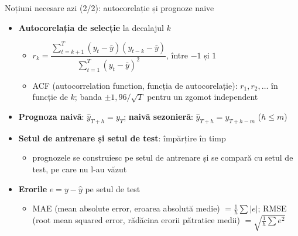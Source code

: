\begin{frame}{Noțiuni necesare azi (2/2): autocorelație și prognoze naive}
\itemsize{\footnotesize}
\begin{itemize}
    \item \textbf{Autocorelația de selecție} la decalajul $k$
    \begin{itemize}
        \item $r_k = \dfrac{\sum_{t=k+1}^{T} (y_t - \bar y)(y_{t-k} - \bar y)}{\sum_{t=1}^{T} (y_t - \bar y)^2}$, între $-1$ și $1$
        \item ACF (autocorrelation function, funcția de autocorelație): $r_1, r_2, \ldots$ în funcție de $k$; banda $\pm 1{,}96/\sqrt T$ pentru un zgomot independent
    \end{itemize}
    \item \textbf{Prognoza naivă}: $\hat y_{T+h} = y_T$; \textbf{naivă sezonieră}: $\hat y_{T+h} = y_{T+h-m}$ ($h \le m$)
    \item \textbf{Setul de antrenare și setul de test}: împărțire în timp
    \begin{itemize}
        \item prognozele se construiesc pe setul de antrenare și se compară cu setul de test, pe care nu l-au văzut
    \end{itemize}
    \item \textbf{Erorile} $e = y - \hat y$ pe setul de test
    \begin{itemize}
        \item MAE (mean absolute error, eroarea absolută medie) $= \frac1h \sum |e|$; RMSE (root mean squared error, rădăcina erorii pătratice medii) $= \sqrt{\frac1h \sum e^2}$
    \end{itemize}
\end{itemize}
\end{frame}


